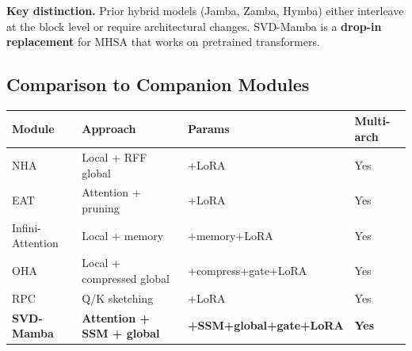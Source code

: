 \textbf{Key distinction.} Prior hybrid models (Jamba, Zamba, Hymba) either 
interleave at the block level or require architectural changes. SVD-Mamba 
is a \textbf{drop-in replacement} for MHSA that works on pretrained transformers.

\subsection{Comparison to Companion Modules}

\begin{table}[H]
\centering
\small
\begin{tabular}{llll}
\toprule
\textbf{Module} & \textbf{Approach} & \textbf{Params} & \textbf{Multi-arch} \\
\midrule
NHA & Local + RFF global & +LoRA & Yes \\
EAT & Attention + pruning & +LoRA & Yes \\
Infini-Attention & Local + memory & +memory+LoRA & Yes \\
OHA & Local + compressed global & +compress+gate+LoRA & Yes \\
RPC & Q/K sketching & +LoRA & Yes \\
\textbf{SVD-Mamba} & \textbf{Attention + SSM + global} & \textbf{+SSM+global+gate+LoRA} & \textbf{Yes} \\
\bottomrule
\end{tabular}
\end{table}

